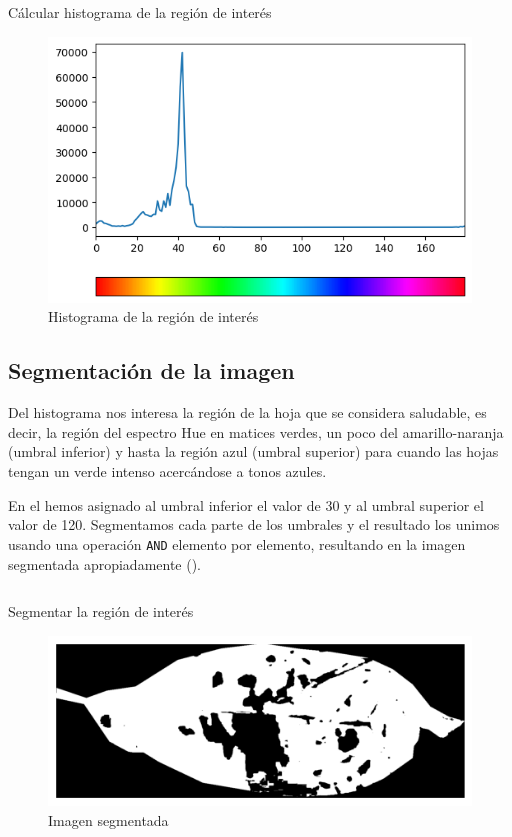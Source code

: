 \begin{listing}[H]
\inputminted{python}{code_listings/histogram.py}
\caption{Cálcular histograma de la región de interés}
\label{code:histogram}
\end{listing}

\begin{figure}[H]
\centering
\includegraphics[width=\textwidth]{images/histogram.png}
\caption{Histograma de la región de interés}
\label{img:histogram}
\end{figure}

\subsection{Segmentación de la imagen}
\label{sec:segmentation}
Del histograma nos interesa la región de la hoja que se considera saludable, es decir, la región del espectro Hue en matices verdes, un poco del amarillo-naranja (umbral inferior) y hasta la región azul (umbral superior) para cuando las hojas tengan un verde intenso acercándose a tonos azules.

En el  hemos asignado al umbral inferior el valor de 30 y al umbral superior el valor de 120. Segmentamos cada parte de los umbrales y el resultado los unimos usando una operación \texttt{AND} elemento por elemento, resultando en la imagen segmentada apropiadamente ().

\begin{listing}[H]
\inputminted{python}{code_listings/segmentation.py}
\caption{Segmentar la región de interés}
\label{code:segmentation}
\end{listing}

\begin{figure}[H]
\centering
\includegraphics[scale=1]{images/segmentation.png}
\caption{Imagen segmentada}
\label{img:segmentation}
\end{figure}

